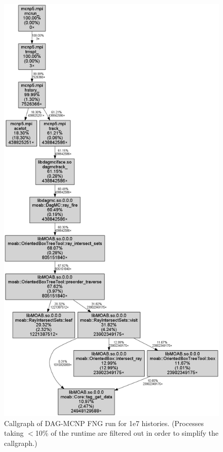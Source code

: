 \documentclass[12pt, a4paper]{article}
\begin{document}
\begin{figure}[H]
  \centering
  \caption{Callgraph of DAG-MCNP FNG run for 1e7 histories. (Processes taking $<$10\% of the runtime are filtered out in order to simplify the callgraph.) }
  \label{dagmc-fng-coarse}
  \includegraphics[scale=0.33]{dagmc_fng_cg_coarse.png}
\end{figure}
\end{document}
